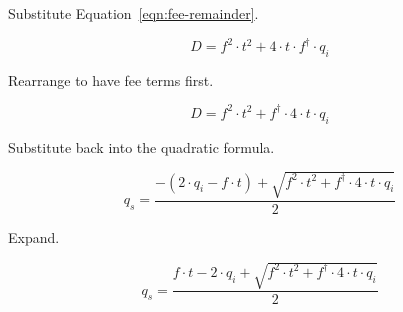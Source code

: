Substitute Equation~\ref{eqn:fee-remainder}.

\begin{equation*}
	D = f^2 \cdot t^2 + 4 \cdot t \cdot f^{\dagger} \cdot q_i
\end{equation*}

Rearrange to have fee terms first.

\begin{equation*}
	D = f^2 \cdot t^2 + f^{\dagger} \cdot 4 \cdot t \cdot q_i
\end{equation*}

Substitute back into the quadratic formula.

\begin{equation*}
	q_s = \frac{-(2 \cdot q_i - f \cdot t) +
		\sqrt{f^2 \cdot t^2 + f^{\dagger} \cdot 4 \cdot t \cdot q_i}}{2}
\end{equation*}

Expand.

\begin{equation*}
	q_s = \frac{f \cdot t - 2 \cdot q_i +
		\sqrt{f^2 \cdot t^2 + f^{\dagger} \cdot 4 \cdot t \cdot q_i}}{2}
\end{equation*}
